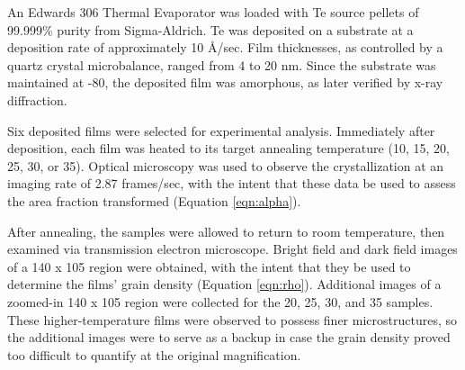 An Edwards 306 Thermal Evaporator was loaded with Te source pellets of 99.999\% purity from Sigma-Aldrich.  Te was deposited on a substrate at a deposition rate of approximately 10 \r{A}/sec.  Film thicknesses, as controlled by a quartz crystal microbalance, ranged from 4 to 20 nm.  Since the substrate was maintained at -80, the deposited film was amorphous, as later verified by x-ray diffraction.\cite{chrzan:2020}

Six deposited films were selected for experimental analysis.  Immediately after deposition, each film was heated to its target annealing temperature (10, 15, 20, 25, 30, or 35).  Optical microscopy was used to observe the crystallization at an imaging rate of 2.87 frames/sec,\cite{chrzan:2020} with the intent that these data be used to assess the area fraction transformed (Equation \ref{eqn:alpha}).

After annealing, the samples were allowed to return to room temperature, then examined via transmission electron microscope.  Bright field and dark field images of a 140  x 105  region were obtained, with the intent that they be used to determine the films' grain density (Equation \ref{eqn:rho}).  Additional images of a zoomed-in 140  x 105  region were collected for the 20, 25, 30, and 35 samples.\cite{chrzan:2020}  These higher-temperature films were observed to possess finer microstructures, so the additional images were to serve as a backup in case the grain density proved too difficult to quantify at the original magnification.
